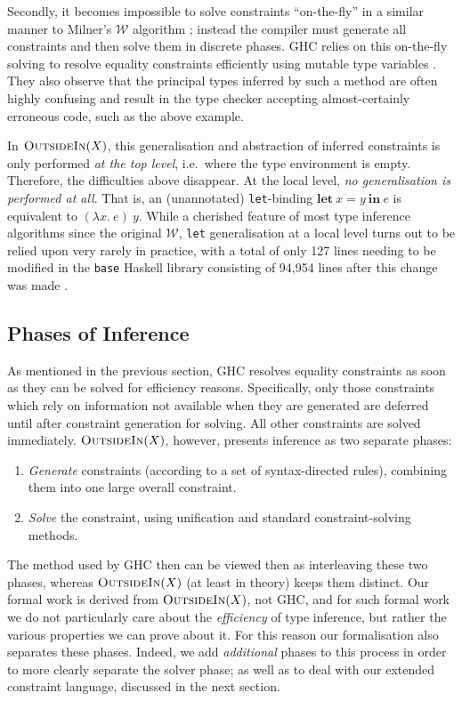 \documentclass[a4paper]{jfp}
\newcommand{\outsidein}{\textsc{OutsideIn}(X)}
\begin{document}
Secondly, it becomes impossible to solve constraints ``on-the-fly'' in a similar manner to Milner's $\mathcal{W}$ algorithm \cite{Milner78atheory};
instead the compiler must generate all constraints and then solve them in discrete phases. GHC relies on this on-the-fly solving to resolve equality
constraints efficiently using mutable type variables \cite{Jones:2007dr}. They also observe that the principal types inferred by such a method are
often highly confusing and result in the type checker accepting almost-certainly erroneous code, such as the above example. 

In $\outsidein$, this generalisation and abstraction of inferred constraints is only performed \emph{at the top level}, i.e.\ where the type
environment is empty. Therefore, the difficulties above disappear. At the local level, \emph{no generalisation is performed at all}. That is, an
(unannotated) {\tt let}-binding $\mathbf{let}\ x = y\ \mathbf{in}\ e$ is equivalent to $(\lambda x.\ e)\ y$. While a cherished
feature of most type inference algorithms since the original $\mathcal{W}$, {\tt let} generalisation at a local level turns out to be relied upon very
rarely in practice, with a total of only 127 lines needing to be modified in the {\tt base} Haskell library consisting of 94,954 lines after this
change was made \cite{Vytiniotis:2010ja}. 


\subsection{Phases of Inference}

As mentioned in the previous section, GHC resolves equality constraints as soon as they can be solved for efficiency reasons.
Specifically, only those constraints which rely on information not available when they are generated are deferred until after constraint generation
for solving. All other constraints are solved immediately.  $\outsidein$, however, presents inference as two separate phases:

\begin{enumerate}
\item \emph{Generate} constraints (according to a set of syntax-directed rules), combining them into one large overall constraint.
\item \emph{Solve} the constraint, using unification and standard constraint-solving methods.	
\end{enumerate} 

The method used by GHC then can be viewed then as interleaving these two phases, whereas $\outsidein$ (at least in theory) keeps them distinct. Our
formal work is derived from $\outsidein$, not GHC, and for such formal work we do not particularly care about the \emph{efficiency} of type inference,
but rather the various properties we can prove about it. For this reason our formalisation also separates these phases. Indeed, we add
\emph{additional} phases to this process in order to more clearly separate the solver phase; as well as to deal with our extended constraint
language, discussed in the next section. 
\end{document}
